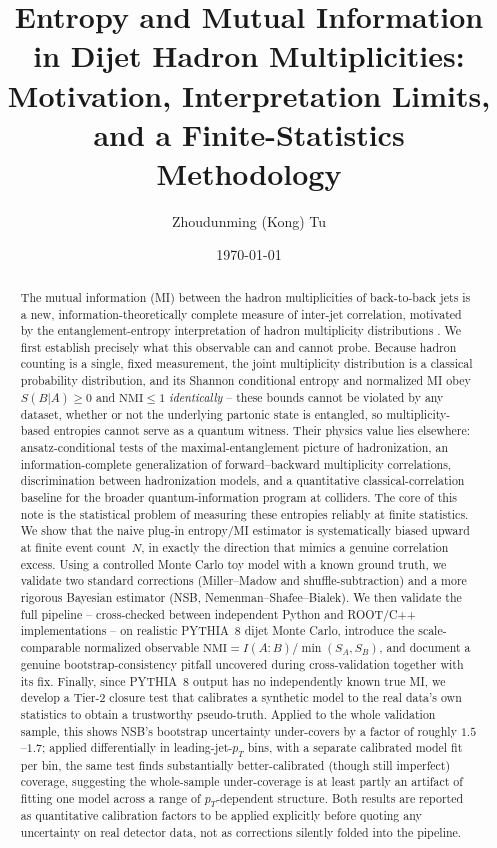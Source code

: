 \documentclass[11pt]{article}
\title{Entropy and Mutual Information in Dijet Hadron Multiplicities:\\
Motivation, Interpretation Limits, and a Finite-Statistics Methodology}
\author[1,2]{Zhoudunming (Kong) Tu}
\affil[1]{Brookhaven National Laboratory}
\affil[2]{Stony Brook University}
\date{\today}
\newcommand{\SBA}{S(B|A)}
\newcommand{\NMI}{\mathrm{NMI}}
\begin{document}
\maketitle

\begin{abstract}
\noindent
The mutual information (MI) between the hadron multiplicities of
back-to-back jets is a new, information-theoretically complete measure
of inter-jet correlation, motivated by the entanglement-entropy
interpretation of hadron multiplicity distributions
\cite{KL2017,TKU2020,H1_2021,Datta2025}. We first establish precisely what
this observable can and cannot probe. Because hadron counting is a
single, fixed measurement, the joint multiplicity distribution is a
classical probability distribution, and its Shannon conditional entropy
and normalized MI obey $\SBA\geq0$ and $\NMI\leq1$ \emph{identically} --
these bounds cannot be violated by any dataset, whether or not the
underlying partonic state is entangled, so multiplicity-based entropies
cannot serve as a quantum witness. Their physics value lies elsewhere:
ansatz-conditional tests of the maximal-entanglement picture of
hadronization, an information-complete generalization of
forward--backward multiplicity correlations, discrimination between
hadronization models, and a quantitative classical-correlation baseline
for the broader quantum-information program at colliders. The core of
this note is the statistical problem of measuring these entropies
reliably at finite statistics. We show that the naive plug-in entropy/MI
estimator is systematically biased upward at finite event count~$N$, in
exactly the direction that mimics a genuine correlation excess. Using a
controlled Monte Carlo toy model with a known ground truth, we validate
two standard corrections (Miller--Madow and shuffle-subtraction) and a
more rigorous Bayesian estimator (NSB, Nemenman--Shafee--Bialek). We then
validate the full pipeline -- cross-checked between independent Python
and ROOT/C++ implementations -- on realistic PYTHIA~8 dijet Monte Carlo,
introduce the scale-comparable normalized observable
$\NMI=I(A{:}B)/\min(S_A,S_B)$, and document a genuine
bootstrap-consistency pitfall uncovered during cross-validation together
with its fix. Finally, since PYTHIA~8 output has no independently known
true MI, we develop a Tier-2 closure test that calibrates a synthetic
model to the real data's own statistics to obtain a trustworthy
pseudo-truth. Applied to the whole validation sample, this shows NSB's
bootstrap uncertainty under-covers by a factor of roughly $1.5$--$1.7$;
applied differentially in leading-jet-$p_T$ bins, with a separate
calibrated model fit per bin, the same test finds substantially
better-calibrated (though still imperfect) coverage, suggesting the
whole-sample under-coverage is at least partly an artifact of fitting one
model across a range of $p_T$-dependent structure. Both results are
reported as quantitative calibration factors to be applied explicitly
before quoting any uncertainty on real detector data, not as corrections
silently folded into the pipeline.
\end{abstract}
\end{document}
